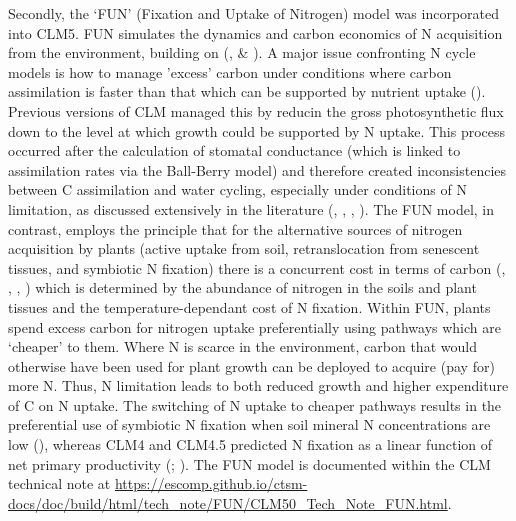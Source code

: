 \documentclass[draft,linenumbers]{agujournal}
\begin{document}
Secondly, the `FUN' (Fixation and Uptake of Nitrogen) model was incorporated into CLM5. FUN simulates the dynamics and carbon economics of N acquisition from the environment, building on (\cite{fisher2010fun}, \cite{brzostek2014} \& \cite{shi2016}). A major issue confronting N cycle models is how to manage 'excess' carbon under conditions where carbon assimilation is faster than that which can be supported by nutrient uptake (\cite{dekauwe2014}). Previous versions of CLM managed this by reducin the gross photosynthetic flux down to the level at which growth could be supported by N uptake. This process occurred after the calculation of stomatal conductance (which is linked to assimilation rates via the Ball-Berry model) and therefore created inconsistencies between C assimilation and water cycling, especially under conditions of N limitation, as discussed extensively in the literature (\cite{medlyn2011}, \cite{bonan2012}, \cite{dekauwe2014}, \cite{walker2014}). The FUN model, in contrast, employs the principle that for the alternative sources of nitrogen acquisition by plants (active uptake from soil, retranslocation from senescent tissues, and symbiotic N fixation) there is a concurrent cost in terms of carbon (\cite{bloom1985}, \cite{rastetter2001},  \cite{jiang2017}, \cite{terrer2018}) which is determined by the abundance of nitrogen in the soils and plant tissues and the temperature-dependant cost of N fixation. Within FUN, plants spend excess carbon for nitrogen uptake preferentially using pathways which are `cheaper' to them. Where N is scarce in the environment, carbon that would otherwise have been used for plant growth can be deployed to acquire (pay for) more N. Thus, N limitation leads to both reduced growth and higher expenditure of C on N uptake.   The switching of N uptake to cheaper pathways results in the preferential use of symbiotic N fixation when soil mineral N concentrations are low (\cite{vitousek2002}), whereas CLM4 and CLM4.5 predicted N fixation as a linear function of net primary productivity (\cite{cleveland1999}; \cite{wieder2015}).   The FUN model is documented within the CLM technical note at \url{https://escomp.github.io/ctsm-docs/doc/build/html/tech_note/FUN/CLM50_Tech_Note_FUN.html}. 
 
\end{document}
